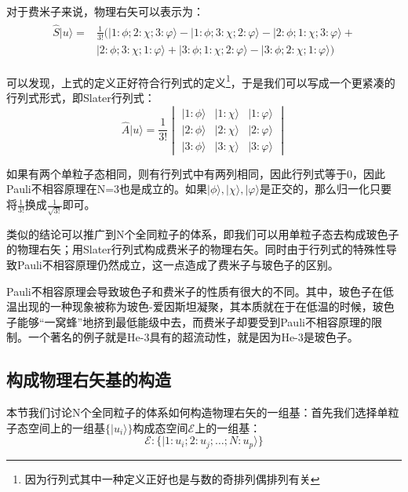      对于费米子来说，物理右矢可以表示为：
     \begin{align}
         \begin{split}
             \hat{S}|u\rangle=&\frac{1}{3!}(|1:\phi;2:\chi;3:\varphi\rangle-|1:\phi;3:\chi;2:\varphi\rangle-|2:\phi;1:\chi;3:\varphi\rangle+\\
             &|2:\phi;3:\chi;1:\varphi\rangle+|3:\phi;1:\chi;2:\varphi\rangle-|3:\phi;2:\chi;1:\varphi\rangle)
         \end{split}
    \end{align}
    
    可以发现，上式的定义正好符合行列式的定义\footnote{因为行列式其中一种定义正好也是与数的奇排列偶排列有关}，于是我们可以写成一个更紧凑的行列式形式，即Slater行列式：
    \begin{equation}
        \hat{A}|u\rangle=\frac{1}{3!}\begin{vmatrix}
            |1:\phi\rangle&|1:\chi\rangle&|1:\varphi\rangle\\
            |2:\phi\rangle&|2:\chi\rangle&|2:\varphi\rangle\\
            |3:\phi\rangle&|3:\chi\rangle&|3:\varphi\rangle
        \end{vmatrix}
    \end{equation}
    
    如果有两个单粒子态相同，则有行列式中有两列相同，因此行列式等于0，因此Pauli不相容原理在N=3也是成立的。如果$|\phi\rangle,|\chi\rangle,|\varphi\rangle$是正交的，那么归一化只要将$\frac{1}{3!}$换成$\frac{1}{\sqrt{3!}}$即可。
    
    类似的结论可以推广到N个全同粒子的体系，即我们可以用单粒子态去构成玻色子的物理右矢；用Slater行列式构成费米子的物理右矢。同时由于行列式的特殊性导致Pauli不相容原理仍然成立，这一点造成了费米子与玻色子的区别。
    \begin{remark}
        Pauli不相容原理会导致玻色子和费米子的性质有很大的不同。其中，玻色子在低温出现的一种现象被称为玻色-爱因斯坦凝聚，其本质就在于在低温的时候，玻色子能够“一窝蜂”地挤到最低能级中去，而费米子却要受到Pauli不相容原理的限制。一个著名的例子就是He-3具有的超流动性，就是因为He-3是玻色子。
    \end{remark}
    \subsection{构成物理右矢基的构造}
    本节我们讨论N个全同粒子的体系如何构造物理右矢的一组基：首先我们选择单粒子态空间上的一组基$\{|u_i\rangle\}$构成态空间$\mathscr{E}$上的一组基：
    \begin{equation}
        \mathscr{E}:\{|1:u_i;2:u_j;\dots;N:u_p\rangle\}
    \end{equation}
    
